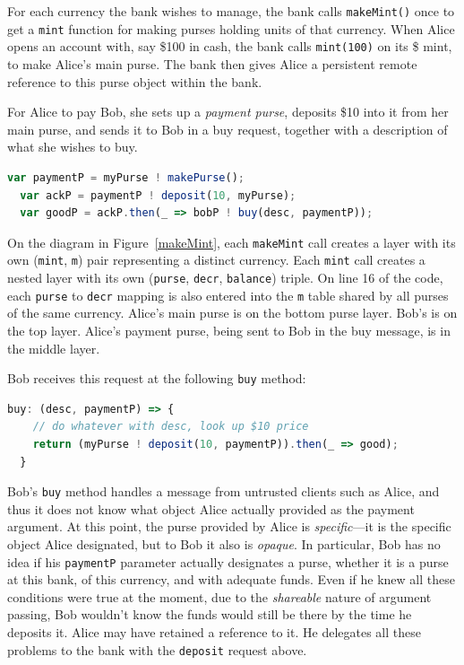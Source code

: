 \documentclass{llncs}
\begin{document}
For each currency the bank wishes to manage, the bank calls {\tt makeMint()} once to get a {\tt mint} function for making purses holding units of that currency. When Alice opens an account with, say \$100 in cash, the bank calls {\tt mint(100)} on its \$ mint, to make Alice's main purse. The bank then gives Alice a persistent remote reference to this purse object within the bank.

For Alice to pay Bob, she sets up a \emph{payment purse}, deposits \$10 into it from her main purse, and sends it to Bob in a buy request, together with a description of what she wishes to buy.
\begin{lstlisting}[language=JavaScript,numbers=none]
  var paymentP = myPurse ! makePurse();
  var ackP = paymentP ! deposit(10, myPurse);
  var goodP = ackP.then(_ => bobP ! buy(desc, paymentP));
\end{lstlisting}

On the diagram in Figure~\ref{makeMint}, each {\tt makeMint} call creates a layer with its own ({\tt mint}, {\tt m}) pair representing a distinct currency. Each {\tt mint} call creates a nested layer with its own ({\tt purse}, {\tt decr}, {\tt balance}) triple. On line 16 of the code, each {\tt purse} to {\tt decr} mapping is also entered into the {\tt m} table shared by all purses of the same currency. Alice's main purse is on the bottom purse layer. Bob's is on the top layer. Alice's payment purse, being sent to Bob in the buy message, is in the middle layer.

Bob receives this request at the following {\tt buy} method:

\begin{lstlisting}[language=JavaScript,numbers=none]
  buy: (desc, paymentP) => {
    // do whatever with desc, look up $10 price
    return (myPurse ! deposit(10, paymentP)).then(_ => good);
  }
\end{lstlisting}

Bob's {\tt buy} method handles a message from untrusted clients such as Alice, and thus it does not know what object Alice actually provided as the payment argument. At this point, the purse provided by Alice is \emph{specific}---it is the specific object Alice designated, but to Bob it also is \emph{opaque}. In particular, Bob has no idea if his {\tt paymentP} parameter actually designates a purse, whether it is a purse at this bank, of this currency, and with adequate funds. Even if he knew all these conditions were true at the moment, due to the \emph{shareable} nature of argument passing, Bob wouldn't know the funds would still be there by the time he deposits it. Alice may have retained a reference to it. He delegates all these problems to the bank with the {\tt deposit} request above. 
\end{document}
